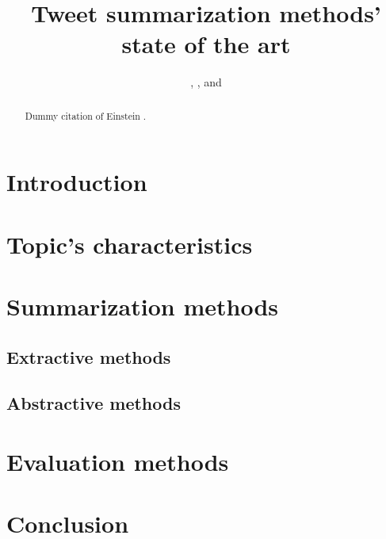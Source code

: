 \documentclass[a4paper, twocolumn]{article}
\begin{document}

\title{Tweet summarization methods' state of the art}
\author{
    ,
    ,
     and
    }
\date{}

\maketitle

\begin{abstract}

Dummy citation of Einstein \cite{einstein}.

\lipsum[1]

\end{abstract}

\section{Introduction}

\lipsum[2]
\lipsum[3]

\section{Topic's characteristics}

\lipsum[4]

\section{Summarization methods}

\lipsum[5]

\subsection{Extractive methods}

\lipsum[6]
\lipsum[7]

\subsection{Abstractive methods}

\lipsum[8]
\lipsum[9]

\section{Evaluation methods}

\lipsum[8]
\lipsum[9]

\section{Conclusion}

\lipsum[8]
\lipsum[9]



\end{document}
